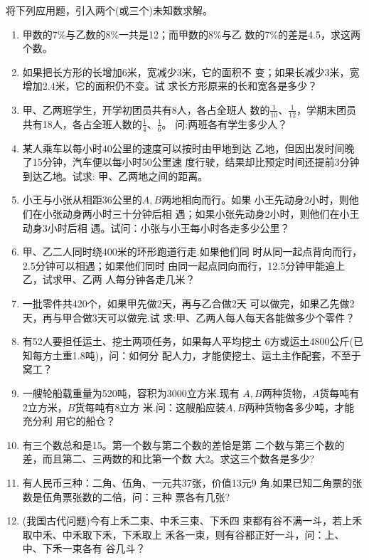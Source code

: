 将下列应用题，引入两个(或三个)未知数求解。

\begin{enumerate}
    \item  甲数的7\%与乙数的8\%一共是12；而甲数的8\%与乙
    数的7\%的差是4.5，求这两个数。
    \item 如果把长方形的长增加6米，宽减少3米，它的面积不
    变；如果长减少3米，宽增加2.4米，它的面积仍不变。试
    求长方形原来的长和宽各是多少？
    \item 甲、乙两班学生，开学初团员共有8人，各占全班人
    数的$\frac{1}{10}$、$\frac{1}{12}$，学期末团员共有18人，各占全班人数的$\frac{1}{4}$、$\frac{1}{6}$。
    问:两班各有学生多少人？
    \item 某人乘车以每小时40公里的速度可以按时由甲地到达
    乙地，但因出发时间晚了15分钟，汽车便以每小时50公里速
    度行驶，结果却比预定时间还提前3分钟到达乙地。试求:
    甲、乙两地之间的距离。
    \item 小王与小张从相距36公里的$A, B$两地相向而行。如果
    小王先动身2小时，则他们在小张动身两小时三十分钟后相
    遇；如果小张先动身2小时，则他们在小王动身3小时后相
    遇。试问：小张与小王每小时各走多少公里？
    \item 甲、乙二人同时绕400米的环形跑道行走.如果他们同
    时从同一起点背向而行，2.5分钟可以相遇；如果他们同时
    由同一起点同向而行，12.5分钟甲能追上乙，试求甲、乙两
    人每分钟各走几米？
    \item 一批零件共420个，如果甲先做2天，再与乙合做2天
    可以做完，如果乙先做2天，再与甲合做3天可以做完.试
    求:甲、乙两人每人每天各能做多少个零件？
    \item 有52人要担任运土、挖土两项任务，如果每人平均挖土
    6方或运土4800公斤(已知每方土重1.8吨)，问：如何分
    配人力，才能使挖土、运土主作配套，不至于窝工？
    \item 一艘轮船载重量为520吨，容积为3000立方米.现有
    $A, B$两种货物，$A$货每吨有2立方米，$B$货每吨有8立方
    米.问：这艘船应装$A, B$两种货物各多少吨，才能充分利
    用它的船仓？
    \item 有三个数总和是15。第一个数与第二个数的差恰是第
    二个数与第三个数的差，而且第二、三两数的和比第一个数
    大2。求这三个数各是多少?
    \item 有人民币三种：二角、伍角、一元共37张，价值13元9
    角.如果已知二角票的张数是伍角票张数的二倍，问：三种
    票各有几张?
    \item (我国古代问题)今有上禾二束、中禾三束、下禾四
    束都有谷不满一斗，若上禾取中禾、中禾取下禾，下禾取上
    禾各一束，则有谷都正好一斗，问：上、中、下禾一束各有
    谷几斗？
    
\end{enumerate}

